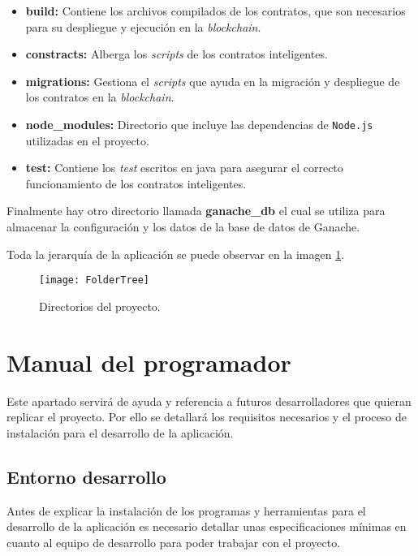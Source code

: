 \begin{itemize}

\item \textbf{build:} Contiene los archivos compilados de los contratos, que son necesarios para su despliegue y ejecución en la \textit{blockchain}.

\item \textbf{constracts:} Alberga los \textit{scripts} de los contratos inteligentes.

\item \textbf{migrations:} Gestiona el \textit{scripts} que ayuda en la migración y despliegue de los contratos en la \textit{blockchain}.

\item \textbf{node\_modules:} Directorio que incluye las dependencias de \texttt{Node.js} utilizadas en el proyecto.

\item \textbf{test:} Contiene los \textit{test} escritos en java para asegurar el correcto funcionamiento de los contratos inteligentes.

\end{itemize}

Finalmente hay otro directorio llamada \textbf{ganache\_db} el cual se utiliza para almacenar la configuración y los datos de la base de datos de Ganache.

Toda la jerarquía de la aplicación se puede observar en la imagen \ref{img:FolderTree}.

\begin{figure}[h]
	\label{img:FolderTree}
	\centering
	\texttt{[image: FolderTree]}
	\caption[Directorios del proyecto]{Directorios del proyecto.}
\end{figure}


\section{Manual del programador}

Este apartado servirá de ayuda y referencia a futuros desarrolladores que quieran replicar el proyecto. 
Por ello se detallará los requisitos necesarios y el proceso de instalación para el desarrollo de la aplicación. 

\subsection{Entorno desarrollo}

Antes de explicar la instalación de los programas y herramientas para el desarrollo de la aplicación es necesario detallar unas especificaciones mínimas en cuanto al equipo de desarrollo para poder trabajar con el proyecto.

